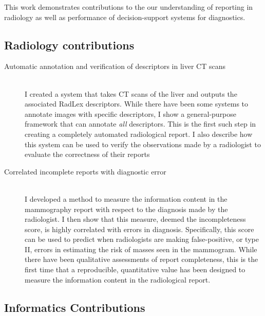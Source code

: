 This work demonstrates contributions to the our understanding of reporting in radiology as well as performance of decision-support systems for diagnostics.

\subsection{Radiology contributions}

\begin{description}
	\item[Automatic annotation and verification of descriptors in liver CT scans] \hfill \\
	I created a system that takes CT scans of the liver and outputs the associated RadLex descriptors. While there have been some systems to annotate images with specific descriptors, I show a general-purpose framework that can annotate \emph{all} descriptors. This is the first such step in creating a completely automated radiological report. I also describe how this system can be used to verify the observations made by a radiologist to evaluate the correctness of their reports
	
	\item[Correlated incomplete reports with diagnostic error] \hfill \\
	I developed a method to measure the information content in the mammography report with respect to the diagnosis made by the radiologist. I then show that this measure, deemed the incompleteness score, is highly correlated with errors in diagnosis. Specifically, this score can be used to predict when radiologists are making false-positive, or type II, errors in estimating the risk of masses seen in the mammogram. While there have been qualitative assessments of report completeness, this is the first time that a reproducible, quantitative value has been designed to measure the information content in the radiological report.
\end{description}



\subsection{Informatics Contributions}

